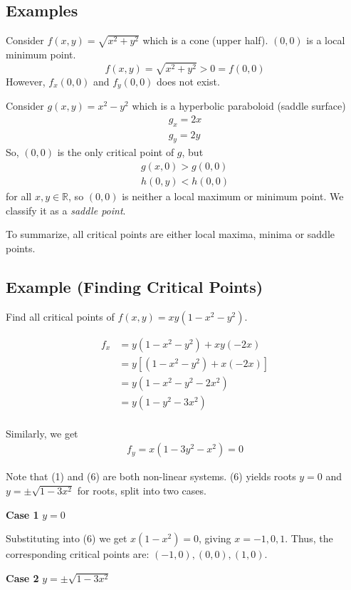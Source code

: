 \subsection{Examples}
Consider $ f(x,y)=\sqrt{x^2+y^2} $ which is a cone (upper half).
$ (0,0) $ is a local minimum point.
\[ f(x,y)=\sqrt{x^2+y^2}>0=f(0,0) \]
However, $ f_x(0,0) $ and $ f_y(0,0) $ does not exist.

Consider $ g(x,y)=x^2-y^2 $ which is a hyperbolic paraboloid (saddle surface)
\begin{align*}
    g_x=2x\\
    g_y=2y
\end{align*}
So, $(0,0)$ is the only critical point of $ g $, but
\begin{align*}
    g(x,0)>g(0,0)\\
    h(0,y)<h(0,0)
\end{align*}
for all $ x,y\in\mathbb{R} $, so $ (0,0) $ is neither a local
maximum or minimum point. We classify it as a \emph{saddle point}.

To summarize, all critical points are either local maxima, minima
or saddle points.

\subsection{Example (Finding Critical Points)}
Find all critical points of $ f(x,y)=xy(1-x^2-y^2) $.

\begin{align}
    f_x&=y(1-x^2-y^2)+xy(-2x)\\
    &=y[(1-x^2-y^2)+x(-2x)]\\
    &=y(1-x^2-y^2-2x^2)\\
    &=y(1-y^2-3x^2)\\
\end{align}

Similarly, we get
\begin{align}
    f_y=x(1-3y^2-x^2)=0
\end{align}

Note that (1) and (6) are both non-linear systems.
(6) yields roots 
$ y=0 $ and $ y=\pm \sqrt{1-3x^2} $ for roots, split into two cases.

\textbf{Case 1} $ y=0 $

Substituting into (6) we get $ x(1-x^2)=0 $, giving $ x={-1},0,1 $. Thus,
the corresponding critical points are: $ ({-1},0),(0,0),(1,0) $.

\textbf{Case 2} $ y=\pm \sqrt{1-3x^2} $

